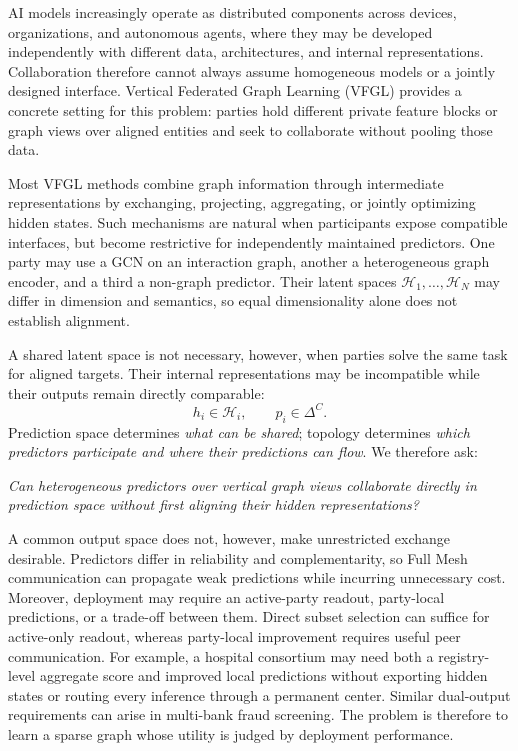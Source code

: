 \documentclass[letterpaper]{article} %
\begin{document}
AI models increasingly operate as distributed components across devices,
organizations, and autonomous agents, where they may be developed independently
with different data, architectures, and internal representations. Collaboration
therefore cannot always assume homogeneous models or a jointly designed
interface. Vertical Federated Graph Learning (VFGL) provides a concrete setting
for this problem: parties hold different private feature blocks or graph views
over aligned entities and seek to collaborate without pooling those data.

Most VFGL methods combine graph information through intermediate
representations by exchanging, projecting, aggregating, or jointly optimizing
hidden states. Such mechanisms are natural when participants expose compatible
interfaces, but become restrictive for independently maintained predictors.
One party may use a GCN on an interaction graph, another a heterogeneous graph
encoder, and a third a non-graph predictor. Their latent spaces
$\mathcal{H}_1,\ldots,\mathcal{H}_N$ may differ in dimension and semantics, so
equal dimensionality alone does not establish alignment.

A shared latent space is not necessary, however, when parties solve the same
task for aligned targets. Their internal representations may be incompatible
while their outputs remain directly comparable:
\[
h_i\in\mathcal{H}_i,
\qquad
p_i\in\Delta^C.
\]
Prediction space determines \emph{what can be shared}; topology determines
\emph{which predictors participate and where their predictions can flow}. We therefore ask:
\begin{center}
\emph{Can heterogeneous predictors over vertical graph views collaborate
directly in prediction space without first aligning their hidden
representations?}
\end{center}

A common output space does not, however, make unrestricted exchange desirable.
Predictors differ in reliability and complementarity, so Full Mesh
communication can propagate weak predictions while incurring unnecessary cost.
Moreover, deployment may require an active-party readout, party-local
predictions, or a trade-off between them. Direct subset selection can suffice
for active-only readout, whereas party-local improvement requires useful peer
communication. For example, a hospital consortium may need both a registry-level aggregate
score and improved local predictions without exporting hidden states or routing
every inference through a permanent center. Similar dual-output requirements can
arise in multi-bank fraud screening. The problem is therefore to learn a sparse
graph whose utility is judged by deployment performance.
\end{document}

